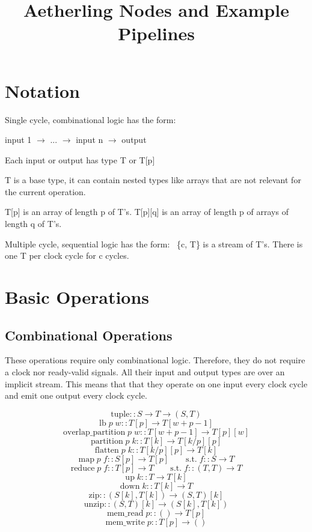\documentclass[11pt,fleqn]{article}
\numberwithin{equation}{subsection}
\begin{document}
\title{Aetherling Nodes and Example Pipelines}

\section{Notation}
Single cycle, combinational logic has the form: 
\begin{adjustwidth}{2.5 em}{0 pt}
    input 1 $\rightarrow$ ... $\rightarrow$ input n $\rightarrow$ output
\end{adjustwidth}

Each input or output has type T or T[p]

T is a base type, it can contain nested types like arrays that are not relevant
for the current operation.

T[p] is an array of length p of T's. T[p][q] is an array of length p of arrays of length q of T's.

Multiple cycle, sequential logic has the form:
\
\{c, T\} is a stream of T's. There is one T per clock cycle for c cycles.

\section{Basic Operations}

\subsection{Combinational Operations}
These operations require only combinational logic. Therefore, they do not
require a clock nor ready-valid signals. All their input and output types are over
an implicit stream. This means that that they operate on one input every clock
cycle and emit one output every clock cycle.

\[
    \text{tuple} :: S \rightarrow T \rightarrow (S,T)
\]
\[
    \text{lb}\;p\;w :: T[p] \rightarrow T[w+p-1] 
\]
\[
    \text{overlap\_partition}\;p\;w :: T[w+p-1] \rightarrow T[p][w]
\]
\[
    \text{partition}\;p\;k :: T[k] \rightarrow T[k/p][p]
\]
\[
    \text{flatten}\;p\;k :: T[k/p][p] \rightarrow T[k]
\]
\[
    \text{map}\;p\;f :: S[p] \rightarrow T[p]   \qquad \text{s.t.}\;f :: S \rightarrow T
\]
\[
    \text{reduce}\;p\;f :: T[p] \rightarrow T \qquad \text{s.t.}\;f :: (T,T)\rightarrow T
\]
\[
    \text{up}\;k :: T \rightarrow T[k]
\]
\[
    \text{down}\;k :: T[k] \rightarrow T 
\]
\[
    \text{zip} :: (S[k],T[k]) \rightarrow (S,T)[k]
\]
\[
    \text{unzip} :: (S,T)[k] \rightarrow (S[k], T[k])
\]
\[
    \text{mem\_read}\;p :: () \rightarrow T[p] 
\]
\[
    \text{mem\_write}\;p :: T[p] \rightarrow ()
\]
\end{document}
